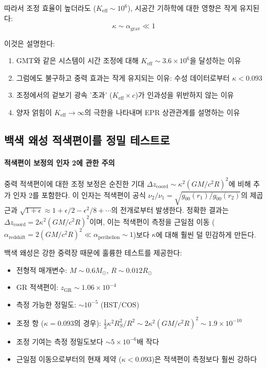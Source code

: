 \documentclass[11pt,a4paper]{article}
\begin{document}
따라서 조정 효율이 높더라도 ($K_{\mathrm{eff}} \sim 10^6$), 시공간 기하학에 대한 영향은 작게 유지된다:
\[
\kappa \sim \alpha_{\text{grav}} \ll 1
\]

이것은 설명한다:
\begin{enumerate}
\item GMT와 같은 시스템이 시간 조정에 대해 $K_{\mathrm{eff}} \sim 3.6\times10^6$을 달성하는 이유
\item 그럼에도 불구하고 중력 효과는 작게 유지되는 이유: 수성 데이터로부터 $\kappa < 0.093$
\item 조정에서의 겉보기 광속 '초과' ($K_{\mathrm{eff}} \times c$)가 인과성을 위반하지 않는 이유
\item 양자 얽힘이 $K_{\mathrm{eff}} \to \infty$의 극한을 나타내며 EPR 상관관계를 설명하는 이유
\end{enumerate}

\subsection{백색 왜성 적색편이를 정밀 테스트로}
\paragraph{적색편이 보정의 인자 2에 관한 주의}
중력 적색편이에 대한 조정 보정은 순진한 기대 $\Delta z_{\text{coord}} \sim \kappa^2 (GM/c^2R)^2$에 비해 추가 인자 2를 포함한다. 이 인자는 적색편이 공식 $\nu_2/\nu_1 = \sqrt{g_{00}(r_1)/g_{00}(r_2)}$의 제곱근과 $\sqrt{1 + \epsilon} \approx 1 + \epsilon/2 - \epsilon^2/8 + \cdots$의 전개로부터 발생한다. 정확한 결과는 $\Delta z_{\text{coord}} = 2\kappa^2 (GM/c^2R)^2$이며, 이는 적색편이 측정을 근일점 이동 ($\alpha_{\text{redshift}} = 2(GM/c^2R)^2 \ll \alpha_{\text{perihelion}} \sim 1$)보다 $\kappa$에 대해 훨씬 덜 민감하게 만든다.

백색 왜성은 강한 중력장 때문에 훌륭한 테스트를 제공한다:
\begin{itemize}
\item 전형적 매개변수: $M \sim 0.6 M_\odot$, $R \sim 0.012 R_\odot$
\item GR 적색편이: $z_{\text{GR}} \sim 1.06\times10^{-4}$
\item 측정 가능한 정밀도: $\sim 10^{-5}$ (HST/COS)
\item 조정 항 ($\kappa = 0.093$의 경우): $\frac{1}{2}\kappa^2 R_S^2/R^2 \sim 2\kappa^2 (GM/c^2R)^2 \sim 1.9\times10^{-10}$
\item 조정 기여는 측정 정밀도보다 $\sim 5\times10^{-6}$배 작다
\item 근일점 이동으로부터의 현재 제약 ($\kappa < 0.093$)은 적색편이 측정보다 훨씬 강하다
\end{itemize}
\end{document}
